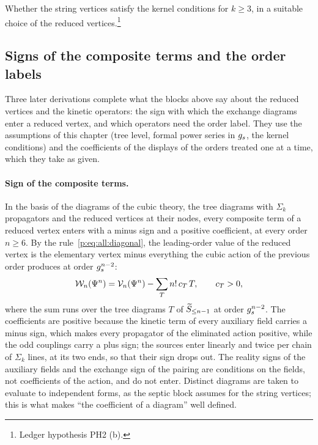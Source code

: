 \noindent{} Whether the string vertices satisfy the kernel conditions for $k \ge 3$, in a suitable choice of the reduced vertices.\footnote{Ledger hypothesis PH2 (b).}



\subsection{Signs of the composite terms and the order labels}
\label{ch3:sec:signs-labels}

Three later derivations complete what the blocks above say about the reduced vertices and the kinetic operators: the sign with which the exchange diagrams enter a reduced vertex, and which operators need the order label.
They use the assumptions of this chapter (tree level, formal power series in $\gs$, the kernel conditions) and the coefficients of the displays of the orders treated one at a time, which they take as given.

\paragraph{Sign of the composite terms.}

\noindent{} In the basis of the diagrams of the cubic theory, the tree diagrams with $\Sigma_k$ propagators and the reduced vertices at their nodes, every composite term of a reduced vertex enters with a minus sign and a positive coefficient, at every order $n \ge 6$.
By the rule~\eqref{p:eq:all:diagonal}, the leading-order value of the reduced vertex is the elementary vertex minus everything the cubic action of the previous order produces at order $\gs^{n - 2}$:
\begin{equation}
  \label{ch3:eq:composite-sign}
  \dvertex{n}(\Psi^n)
    = \vertex{n}(\Psi^n)
      - \sum_T n! \, c_T \, T,
  \qquad
  c_T
    > 0,
\end{equation}
where the sum runs over the tree diagrams $T$ of $\caction[\le n - 1]$ at order $\gs^{n - 2}$.
The coefficients are positive because the kinetic term of every auxiliary field carries a minus sign, which makes every propagator of the eliminated action positive, while the odd couplings carry a plus sign; the sources enter linearly and twice per chain of $\Sigma_k$ lines, at its two ends, so that their sign drops out.
The reality signs of the auxiliary fields and the exchange sign of the pairing are conditions on the fields, not coefficients of the action, and do not enter.
Distinct diagrams are taken to evaluate to independent forms, as the septic block assumes for the string vertices; this is what makes \enquote{the coefficient of a diagram} well defined.

